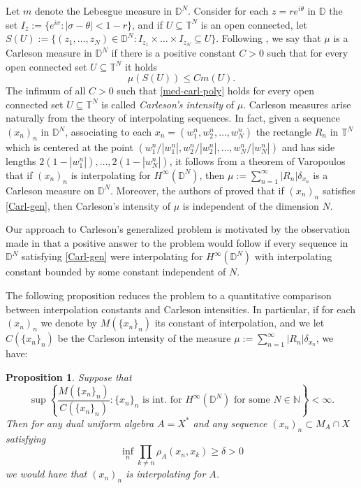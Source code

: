 \documentclass[preprint,12pt,number]{elsarticle}
\newtheorem{proposition}[theorem]{Proposition}
\newcommand{\N}{\mathbb{N}}
\newcommand{\D}{\mathbb{D}}
\newcommand{\T}{\mathbb{T}}
\begin{document}
Let $m$ denote the Lebesgue measure in $\D^N$. Consider for each $z=re^{i\theta}$ in $\D$ the set $I_z:=\{e^{i\sigma}:|\sigma-\theta|<1-r\}$, and if $U\subseteq \T^N$ is an open connected,   let  $S(U):=\{(z_1,\dots,z_N)\in\D^N : I_{z_1}\times\dots\times I_{z_N}\subseteq U \}$. Following \cite{Chang1979}, we say that $\mu$ is a Carleson measure in $\D^N$ if there is a positive constant $C>0$ such that for every open connected set $U\subseteq \T^N$ it holds
\begin{equation}\label{med-carl-poly}
    \mu(S(U))\leq C m(U). 
\end{equation} 
The infimum of all $C>0$ such that \eqref{med-carl-poly} holds for every open connected set $U\subseteq \T^N$ is called \emph{Carleson's intensity} of $\mu$. 
Carleson measures arise naturally from the theory of interpolating sequences. In fact, given a sequence $(x_n)_n$ in $\D^N$, associating to each  $x_n=(w_1^n,w_2^n,\dots,w_N^n)$ the rectangle $R_n$ in $\T^N$ which is centered at the point $(w_1^n/|w_1^n|,w_2^n/|w_2^n|,\dots,w_N^n/|w_N^n|)$ and has side lengths $2(1-|w_1^n|),\dots,2(1-|w_N^n|)$, it follows from a theorem of Varopoulos \cite{Varopoulos1972} that if $(x_n)_n$ is interpolating for $H^\infty(\D^N)$, then $\mu:=\sum_{n=1}^\infty|R_n|\delta_{x_n}$ is a Carleson measure on $\D^N$. Moreover, the authors of \cite{BerndtssonChangLin1987} proved that if $(x_n)_n$ satisfies \eqref{Carl-gen}, then Carleson's intensity of $\mu$ is independent of the dimension $N$.

Our approach to Carleson's generalized problem is motivated by the observation made in \cite{BerndtssonChangLin1987}  that a positive answer to the problem would follow if every sequence in $\D^N$ satisfying \eqref{Carl-gen} were interpolating for $H^\infty(\D^N)$ with interpolating constant bounded by some constant independent of $N$. 

The following proposition reduces the problem to a quantitative comparison between interpolation constants and Carleson intensities. In particular, if for each $(x_n)_n$ we denote by $M(\{x_n\}_n)$ its constant of interpolation, and we let $C(\{x_n\}_n)$ be the Carleson intensity of the measure $\mu:=\sum_{n=1}^\infty|R_n|\delta_{x_n}$, we have:

\begin{proposition}\label{reduccion-carl-gen}
   Suppose that 
   \begin{equation}\label{prop}
       \sup\left\{ \frac{M(\{x_n\}_n)}{C(\{x_n\}_n)}: \{x_n\}_n \text{ is int. for } H^\infty(\D^N)\text{ for some } N\in\N\right\}<\infty.
   \end{equation} 
   Then for any dual uniform algebra $A=X^*$ and any sequence $(x_n)_n\subset M_A\cap X$ satisfying 
   \[
   \inf_n \prod_{k\neq n}\rho_A(x_n,x_k)\geq \delta>0
   \] 
   we would have that $(x_n)_n$ is interpolating for $A$.
\end{proposition}
\end{document}
